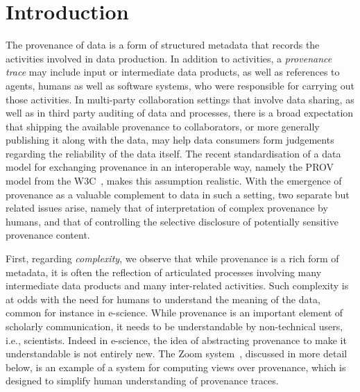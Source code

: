 
\section{Introduction}


The provenance of data is a form of structured metadata that records the activities involved in data production. In addition to activities, a \textit{provenance trace} may include input  or intermediate data products, as well as references to agents, humans as well as software systems, who were responsible for carrying out those activities.
%
In multi-party collaboration settings that involve data sharing, as well as in third party auditing of data and processes, there is a broad expectation that 
shipping the available provenance to collaborators, or more generally publishing it along with the data, may help data consumers form judgements regarding the reliability of the data itself.
%
%
The recent standardisation of a data model for exchanging provenance in an interoperable way, namely the PROV model from the W3C~\citep{w3c-prov-dm}, makes this assumption realistic.
%
With the emergence of provenance as a valuable complement to data in such a setting, two separate but related issues arise, namely that of interpretation of complex provenance by humans,  and that of controlling the selective disclosure of potentially sensitive provenance content.
  
%
First, regarding \textit{complexity}, we observe that while provenance is a rich form of metadata, it is often the reflection of articulated processes involving many intermediate data products and many inter-related activities. 
%
Such complexity is at odds with the need for humans to understand the meaning of the data, common for instance in e-science. 
While provenance is an important element of scholarly communication, it needs to be understandable by non-technical users, i.e., scientists. 
%
Indeed in e-science, the idea of abstracting provenance to make it understandable is not entirely new.
%
The Zoom system~\citep{DBLP:conf/icde/BitonBDH08}, discussed in more detail below, is an example of a system for computing views over provenance, which is designed to simplify human understanding of provenance traces.
%

